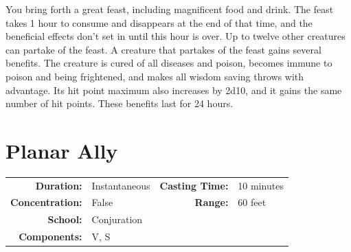 \documentclass[12pt,showtrims]{memoir}
\begin{document}
\vspace{1\baselineskip}\noindent You bring forth a great feast, including magnificent food and drink. The feast takes 1 hour to consume and disappears at the end of that time, and the beneficial effects don't set in until this hour is over. Up to twelve other creatures can partake of the feast. A creature that partakes of the feast gains several benefits. The creature is cured of all diseases and poison, becomes immune to poison and being frightened, and makes all wisdom saving throws with advantage. Its hit point maximum also increases by 2d10, and it gains the same number of hit points. These benefits last for 24 hours.

\newpage
\section*{Planar Ally}

{
\small\centering\vspace{-6pt}
\begin{tabular}{rlrl}
\toprule

\textbf{Duration:} & Instantaneous &
\textbf{Casting Time:} & 10 minutes \\
\textbf{Concentration:} & False &
\textbf{Range:} & 60 feet \\
\textbf{School:} & Conjuration \\
\textbf{Components:} & \multicolumn{3}{p{0.7\textwidth}}{V, S}\\

\bottomrule
\end{tabular}
}
\end{document}

